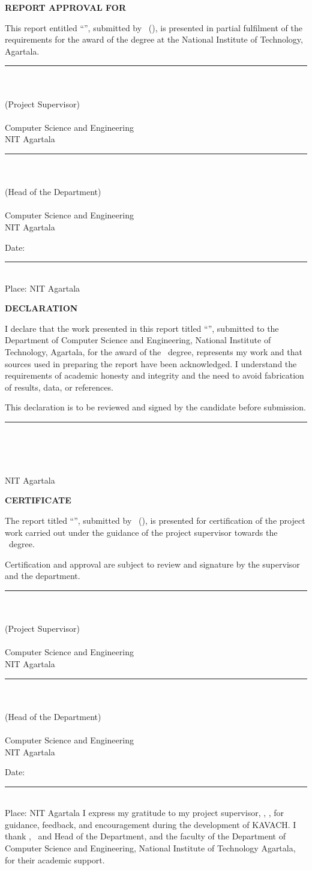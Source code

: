 \documentclass[a4paper,12pt]{nitathesis}
\numberwithin{figure}{chapter}
\newcommand{\fronttitle}[1]{\clearpage\thispagestyle{plain}\begin{center}\LARGE\bfseries #1\end{center}\vspace{1.2cm}}
\newcommand{\facultyblock}[3]{\begin{minipage}[t]{0.46\textwidth}\centering\rule{6cm}{0.4pt}\\#1\\#2\\#3\\\small Computer Science and Engineering\\NIT Agartala\end{minipage}}
\begin{document}
\fronttitle{REPORT APPROVAL FOR \DegreeShort}
This report entitled ``\ReportTitle'', submitted by \CandidateName\ (\RollNumber), is presented in partial fulfilment of the requirements for the award of the \textbf{\DegreeName} degree at the National Institute of Technology, Agartala.
\vspace{2.5cm}\par\noindent
\facultyblock{\SupervisorName}{(Project Supervisor)}{\SupervisorDesignation}\hfill\facultyblock{\HodName}{(Head of the Department)}{\HodDesignation}
\vspace{2cm}\par\noindent Date: \rule{5cm}{0.4pt}\\Place: NIT Agartala
\fronttitle{DECLARATION}
I declare that the work presented in this report titled ``\ReportTitle'', submitted to the Department of Computer Science and Engineering, National Institute of Technology, Agartala, for the award of the \DegreeName\ degree, represents my work and that sources used in preparing the report have been acknowledged. I understand the requirements of academic honesty and integrity and the need to avoid fabrication of results, data, or references.

This declaration is to be reviewed and signed by the candidate before submission.
\vspace{2cm}\par\hfill\begin{minipage}{7cm}\centering\rule{6cm}{0.4pt}\\\CandidateName\\\RollNumber\end{minipage}
\vspace{1.2cm}\par\noindent\SubmissionDate\\NIT Agartala
\fronttitle{CERTIFICATE}
The report titled ``\ReportTitle'', submitted by \CandidateName\ (\RollNumber), is presented for certification of the project work carried out under the guidance of the project supervisor towards the \DegreeName\ degree.

Certification and approval are subject to review and signature by the supervisor and the department.
\vspace{2.5cm}\par\noindent
\facultyblock{\SupervisorName}{(Project Supervisor)}{\SupervisorDesignation}\hfill\facultyblock{\HodName}{(Head of the Department)}{\HodDesignation}
\vspace{2cm}\par\noindent Date: \rule{5cm}{0.4pt}\\Place: NIT Agartala
I express my gratitude to my project supervisor, \SupervisorName, \SupervisorDesignation, for guidance, feedback, and encouragement during the development of KAVACH. I thank \HodName, \HodDesignation\ and Head of the Department, and the faculty of the Department of Computer Science and Engineering, National Institute of Technology Agartala, for their academic support.
\end{document}
